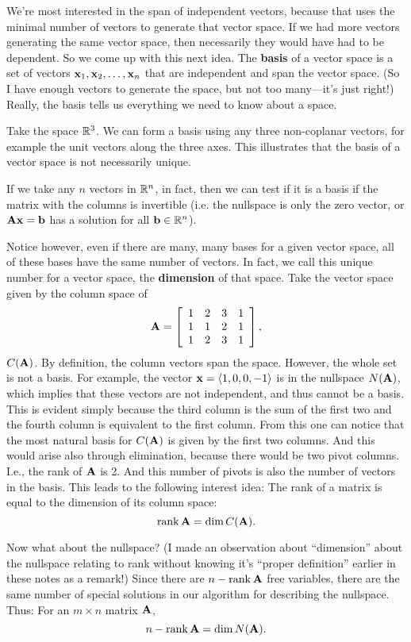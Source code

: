 We're most interested in the span of independent vectors, because that uses the minimal number of vectors to generate that vector space. If we had more vectors generating the same vector space, then necessarily they would have had to be dependent. So we come up with this next idea.
\bdf
The \textbf{basis} of a vector space is a set of vectors $\boldsymbol{\mathbf{x}}_1,\boldsymbol{\mathbf{x}}_2,\ldots,\boldsymbol{\mathbf{x}}_n$ that are independent and span the vector space.
\edf
(So I have enough vectors to generate the space, but not too many---it's just right!) Really, the basis tells us everything we need to know about a space. 

\bex
Take the space $\mathbb{R}^3$. We can form a basis using any three non-coplanar vectors, for example the unit vectors along the three axes. This illustrates that the basis of a vector space is not necessarily unique. 

If we take any $n$ vectors in $\mathbb{R}^n$, in fact, then we can test if it is a basis if the matrix with the columns is invertible (i.e. the nullspace is only the zero vector, or $\boldsymbol{\mathbf{A}}\boldsymbol{\mathbf{x}} = \boldsymbol{\mathbf{b}}$ has a solution for all $\boldsymbol{\mathbf{b}} \in \mathbb{R}^n$). 
\eex

Notice however, even if there are many, many bases for a given vector space, all of these bases have the same number of vectors. In fact, we call this unique number for a vector space, the \textbf{dimension} of that space. 
\bex
Take the vector space given by the column space of
\[ \boldsymbol{\mathbf{A}} = \left[ \begin{array}{rrrrrrrrrrrrrrrrrrrrrrrrr} 1&2&3&1\\1&1&2&1\\1&2&3&1\\ \end{array} \right], \]
$C(\boldsymbol{\mathbf{A}})$. By definition, the column vectors span the space. However, the whole set is not a basis. For example, the vector $\boldsymbol{\mathbf{x}} = \langle 1,0,0,-1 \rangle$ is in the nullspace $N(\boldsymbol{\mathbf{A}})$, which implies that these vectors are not independent, and thus cannot be a basis. This is evident simply because the third column is the sum of the first two and the fourth column is equivalent to the first column. From this one can notice that the most natural basis for $C(\boldsymbol{\mathbf{A}})$ is given by the first two columns. And this would arise also through elimination, because there would be two pivot columns. I.e., the rank of $\boldsymbol{\mathbf{A}}$ is 2. And this number of pivots is also the number of vectors in the basis.
\eex
This leads to the following interest idea:
\btm
The rank of a matrix is equal to the dimension of its column space:
\[ \mathrm{rank}\, \boldsymbol{\mathbf{A}} = \mathrm{dim}\, C(\boldsymbol{\mathbf{A}}). \] 
\etm 

Now what about the nullspace? (I made an observation about ``dimension'' about the nullspace relating to rank without knowing it's ``proper definition'' earlier in these notes as a remark!) Since there are $n - \mathrm{rank}\, \boldsymbol{\mathbf{A}}$ free variables, there are the same number of special solutions in our algorithm for describing the nullspace. Thus:
\btm
For an $m \times n$ matrix $\boldsymbol{\mathbf{A}}$,
\[ n - \mathrm{rank}\, \boldsymbol{\mathbf{A}} = \mathrm{dim}\, N(\boldsymbol{\mathbf{A}}). \]
\etm